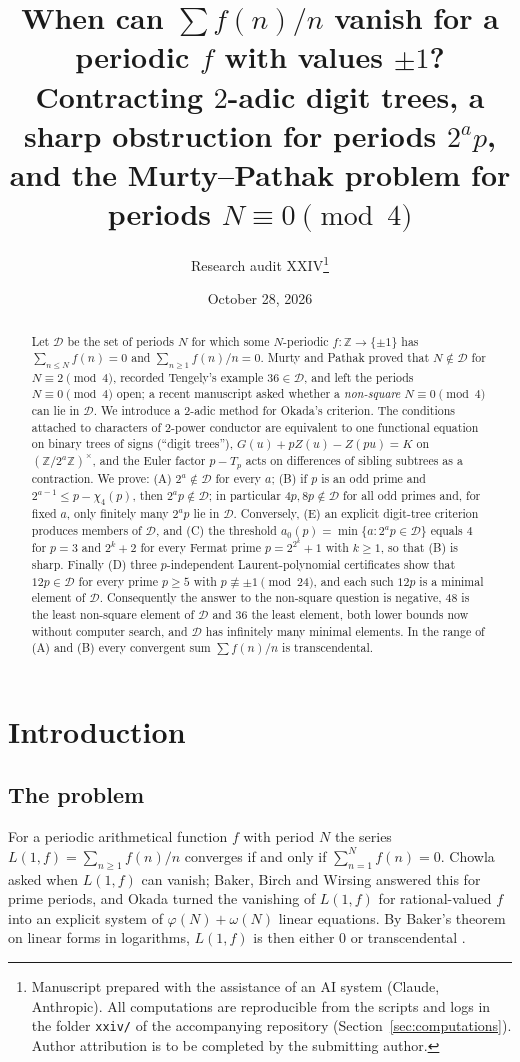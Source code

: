 \documentclass[11pt,a4paper]{article}
\title{When can $\sum f(n)/n$ vanish for a periodic $f$ with values $\pm1$?\\[2pt]
\large Contracting $2$-adic digit trees, a sharp obstruction for periods $2^ap$,\\ and the Murty--Pathak problem for periods $N\equiv0\pmod 4$}
\author{Research audit XXIV\thanks{Manuscript prepared with the assistance of an AI system (Claude, Anthropic). All computations are reproducible from the scripts and logs in the folder \texttt{xxiv/} of the accompanying repository (Section~\ref{sec:computations}). Author attribution is to be completed by the submitting author.}}
\date{October 28, 2026}
\theoremstyle{definition}
\theoremstyle{remark}
\newcommand{\Z}{\mathbb{Z}}
\newcommand{\cD}{\mathcal{D}}
\begin{document}
\maketitle

\begin{abstract}
Let $\cD$ be the set of periods $N$ for which some $N$-periodic $f\colon\Z\to\{\pm1\}$ has $\sum_{n\le N}f(n)=0$ and $\sum_{n\ge1}f(n)/n=0$. Murty and Pathak proved that $N\notin\cD$ for $N\equiv2\pmod4$, recorded Tengely's example $36\in\cD$, and left the periods $N\equiv0\pmod4$ open; a recent manuscript asked whether a \emph{non-square} $N\equiv0\pmod 4$ can lie in $\cD$. We introduce a $2$-adic method for Okada's criterion. The conditions attached to characters of $2$-power conductor are equivalent to one functional equation on binary trees of signs (``digit trees''), $G(u)+pZ(u)-Z(pu)=K$ on $(\Z/2^a\Z)^\times$, and the Euler factor $p-T_p$ acts on differences of sibling subtrees as a contraction. We prove: (A) $2^a\notin\cD$ for every $a$; (B) if $p$ is an odd prime and $2^{a-1}\le p-\chi_4(p)$, then $2^ap\notin\cD$; in particular $4p,8p\notin\cD$ for all odd primes and, for fixed $a$, only finitely many $2^ap$ lie in $\cD$. Conversely, (E) an explicit digit-tree criterion produces members of $\cD$, and (C) the threshold $a_0(p)=\min\{a:2^ap\in\cD\}$ equals $4$ for $p=3$ and $2^k+2$ for every Fermat prime $p=2^{2^k}+1$ with $k\ge1$, so that (B) is sharp. Finally (D) three $p$-independent Laurent-polynomial certificates show that $12p\in\cD$ for every prime $p\ge5$ with $p\not\equiv\pm1\pmod{24}$, and each such $12p$ is a minimal element of $\cD$. Consequently the answer to the non-square question is negative, $48$ is the least non-square element of $\cD$ and $36$ the least element, both lower bounds now without computer search, and $\cD$ has infinitely many minimal elements. In the range of (A) and (B) every convergent sum $\sum f(n)/n$ is transcendental.
\end{abstract}

\tableofcontents

\section{Introduction}\label{sec:intro}

\subsection{The problem}
For a periodic arithmetical function $f$ with period $N$ the series $L(1,f)=\sum_{n\ge1}f(n)/n$ converges if and only if $\sum_{n=1}^Nf(n)=0$. Chowla \cite{Cho70} asked when $L(1,f)$ can vanish; Baker, Birch and Wirsing \cite{BBW73} answered this for prime periods, and Okada \cite{Oka82} turned the vanishing of $L(1,f)$ for rational-valued $f$ into an explicit system of $\varphi(N)+\omega(N)$ linear equations. By Baker's theorem on linear forms in logarithms, $L(1,f)$ is then either $0$ or transcendental \cite{Bak75,BBW73,MS07}.
\end{document}
